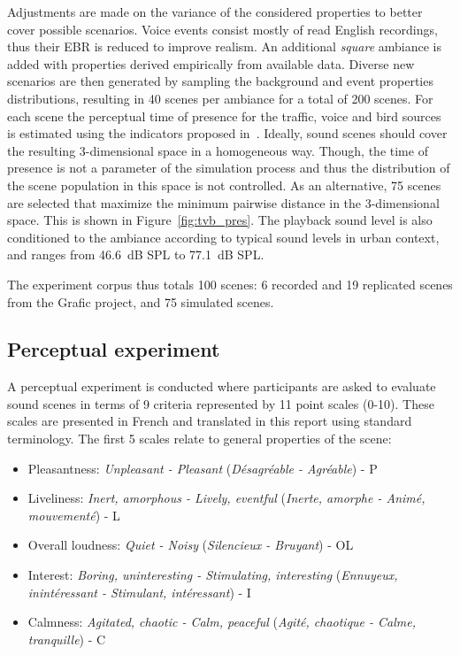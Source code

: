 \documentclass[11pt,a4paper]{article}
\begin{document}
Adjustments are made on the variance of the considered properties to better cover possible scenarios. Voice events consist mostly of read English recordings, thus their EBR is reduced to improve realism. An additional \textit{square} ambiance is added with properties derived empirically from available data. Diverse new scenarios are then generated by sampling the background and event properties distributions, resulting in 40 scenes per ambiance for a total of 200 scenes. For each scene the perceptual time of presence for the traffic, voice and bird sources is estimated using the indicators proposed in~\cite{gontier2018}. Ideally, sound scenes should cover the resulting 3-dimensional space in a homogeneous way. Though, the time of presence is not a parameter of the simulation process and thus the distribution of the scene population in this space is not controlled. As an alternative, 75 scenes are selected that maximize the minimum pairwise distance in the 3-dimensional space. This is shown in Figure~\ref{fig:tvb_pres}. The playback sound level is also conditioned to the ambiance according to typical sound levels in urban context, and ranges from 46.6~dB SPL to 77.1~dB SPL.

The experiment corpus thus totals 100 scenes: 6 recorded and 19 replicated scenes from the Grafic project, and 75 simulated scenes.


\subsection{Perceptual experiment}
\label{sec:data_exp}

A perceptual experiment is conducted where participants are asked to evaluate sound scenes in terms of 9 criteria represented by 11 point scales (0-10). These scales are presented in French and translated in this report using standard terminology. The first 5 scales relate to general properties of the scene:
\begin{itemize}
\item Pleasantness: \textit{Unpleasant - Pleasant} (\textit{D\'esagr\'eable - Agr\'eable}) - P
\item Liveliness: \textit{Inert, amorphous - Lively, eventful} (\textit{Inerte, amorphe - Anim\'e, mouvement\'e}) - L
\item Overall loudness: \textit{Quiet - Noisy} (\textit{Silencieux - Bruyant}) - OL
\item Interest: \textit{Boring, uninteresting - Stimulating, interesting} (\textit{Ennuyeux, inint\'eressant - Stimulant, int\'eressant}) - I
\item Calmness: \textit{Agitated, chaotic - Calm, peaceful} (\textit{Agit\'e, chaotique - Calme, tranquille}) - C
\end{itemize}
\end{document}
